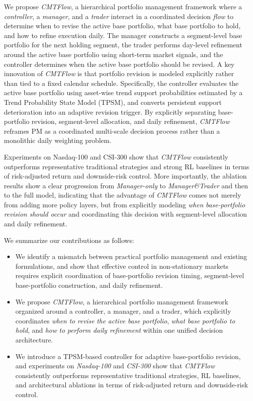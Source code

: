 \documentclass[letterpaper]{article} %
\begin{document}
We propose \textit{CMTFlow}, a hierarchical portfolio management framework where a \emph{controller}, a \emph{manager}, and a \emph{trader} interact in a coordinated decision \emph{flow} to determine when to revise the active base portfolio, what base portfolio to hold, and how to refine execution daily. The manager constructs a segment-level base portfolio for the next holding segment, the trader performs day-level refinement around the active base portfolio using short-term market signals, and the controller determines when the active base portfolio should be revised. A key innovation of \textit{CMTFlow} is that portfolio revision is modeled explicitly rather than tied to a fixed calendar schedule. Specifically, the controller evaluates the active base portfolio using asset-wise trend support probabilities estimated by a Trend Probability State Model (TPSM), and converts persistent support deterioration into an adaptive revision trigger. By explicitly separating base-portfolio revision, segment-level allocation, and daily refinement, \textit{CMTFlow} reframes PM as a coordinated multi-scale decision process rather than a monolithic daily weighting problem.

Experiments on Nasdaq-100 and CSI-300 show that \textit{CMTFlow} consistently outperforms representative traditional strategies and strong RL baselines in terms of risk-adjusted return and downside-risk control. More importantly, the ablation results show a clear progression from \emph{Manager-only} to \emph{Manager\&Trader} and then to the full model, indicating that the advantage of \textit{CMTFlow} comes not merely from adding more policy layers, but from explicitly modeling \emph{when base-portfolio revision should occur} and coordinating this decision with segment-level allocation and daily refinement.

We summarize our contributions as follows:
\begin{itemize}
    \item We identify a mismatch between practical portfolio management and existing formulations, and show that effective control in non-stationary markets requires explicit coordination of base-portfolio revision timing, segment-level base-portfolio construction, and daily refinement.
    \item We propose \textit{CMTFlow}, a hierarchical portfolio management framework organized around a controller, a manager, and a trader, which explicitly coordinates \emph{when to revise the active base portfolio}, \emph{what base portfolio to hold}, and \emph{how to perform daily refinement} within one unified decision architecture.
    \item We introduce a TPSM-based controller for adaptive base-portfolio revision, and experiments on \textit{Nasdaq-100} and \textit{CSI-300} show that \textit{CMTFlow} consistently outperforms representative traditional strategies, RL baselines, and architectural ablations in terms of risk-adjusted return and downside-risk control.
\end{itemize}
\end{document}
